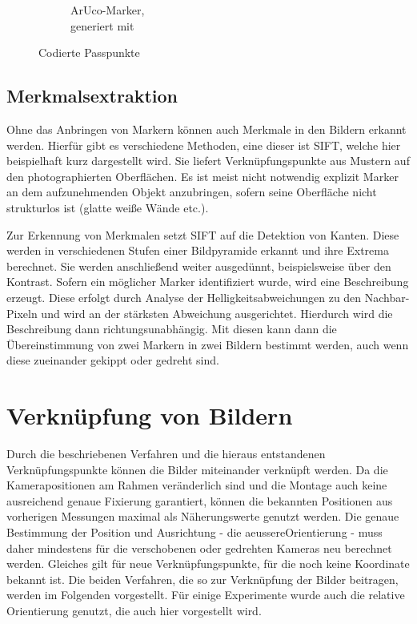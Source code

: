 \documentclass[./00PhotoBox.tex]{subfiles}
\begin{document}
\begin{figure}
\begin{subfigure}{0.45\textwidth}
        \centering
        \caption{ArUco-Marker,\\generiert mit \cite{opencv}\\} %
        \label{img:aruco} %
    \end{subfigure}
    \caption{Codierte Passpunkte} %
\end{figure}

\subsection{Merkmalsextraktion}
\label{ss:sift}
Ohne das Anbringen von Markern können auch Merkmale in den Bildern erkannt werden. Hierfür gibt es verschiedene Methoden, eine dieser ist \Gls{SIFT}, welche hier beispielhaft kurz dargestellt wird. Sie liefert Verknüpfungspunkte aus Mustern auf den photographierten Oberflächen. Es ist meist nicht notwendig explizit Marker an dem aufzunehmenden Objekt anzubringen, sofern seine Oberfläche nicht strukturlos ist (glatte weiße Wände etc.).

Zur Erkennung von Merkmalen setzt \gls{SIFT} auf die Detektion von Kanten. Diese werden in verschiedenen Stufen einer Bildpyramide erkannt und ihre Extrema berechnet. Sie werden anschließend weiter ausgedünnt, beispielsweise über den Kontrast. Sofern ein möglicher Marker identifiziert wurde, wird eine Beschreibung erzeugt. Diese erfolgt  durch Analyse der Helligkeitsabweichungen zu den Nachbar-Pixeln und wird an der stärksten Abweichung ausgerichtet. Hierdurch wird die Beschreibung dann richtungsunabhängig. Mit diesen kann dann die Übereinstimmung von zwei Markern in zwei Bildern bestimmt werden, auch wenn diese zueinander gekippt oder gedreht sind.
\citep[S. 484f]{luhmann}

\section{Verknüpfung von Bildern}
\label{s:photogramm}
Durch die beschriebenen Verfahren und die hieraus entstandenen Verknüpfungs\-punkte können die Bilder miteinander verknüpft werden. Da die Kamerapositionen am Rahmen veränderlich sind und die Montage auch keine ausreichend genaue Fixierung garantiert, können die bekannten Positionen aus vorherigen Messungen maximal als Näherungswerte genutzt werden. Die genaue Bestimmung der Position und Ausrichtung - die \gls{aeussereOrientierung} - muss daher mindestens für die verschobenen oder gedrehten Kameras neu berechnet werden. Gleiches gilt für neue Verknüpfungspunkte, für die noch keine Koordinate bekannt ist. Die beiden Verfahren, die so zur Verknüpfung der Bilder beitragen, werden im Folgenden vorgestellt. Für einige Experimente wurde auch die relative Orientierung genutzt, die auch hier vorgestellt wird.
\end{document}
